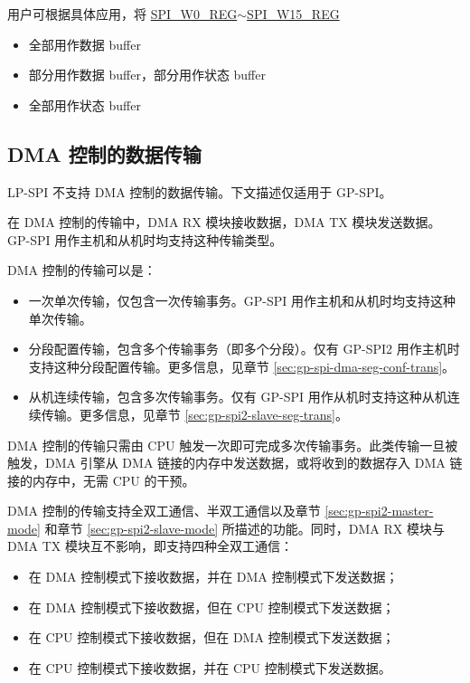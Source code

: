 \documentclass[main\_\_CN.tex]{subfiles}
\begin{document}
用户可根据具体应用，将 \hyperref[regdesc:SPIW0REG]{SPI\_W0\_REG}$\sim$\hyperref[regdesc:SPIW15REG]{SPI\_W15\_REG}
\begin{itemize}
    \item 全部用作数据 buffer
    \item 部分用作数据 buffer，部分用作状态 buffer
    \item 全部用作状态 buffer
\end{itemize}


\subsection{DMA 控制的数据传输}\label{sec:usage-of-gp-spi2-dma-controlled-mode}
\vspace{2em}
\begin{tiplisting}
    LP-SPI 不支持 DMA 控制的数据传输。下文描述仅适用于 GP-SPI。
\end{tiplisting}

在 DMA 控制的传输中，DMA RX 模块接收数据，DMA TX 模块发送数据。GP-SPI 用作主机和从机时均支持这种传输类型。

DMA 控制的传输可以是：

\begin{itemize}
    \item 一次单次传输，仅包含一次传输事务。GP-SPI 用作主机和从机时均支持这种单次传输。
    \item 分段配置传输，包含多个传输事务（即多个分段）。仅有 GP-SPI2 用作主机时支持这种分段配置传输。更多信息，见章节 \ref{sec:gp-spi-dma-seg-conf-trans}。
    \item 从机连续传输，包含多次传输事务。仅有 GP-SPI 用作从机时支持这种从机连续传输。更多信息，见章节 \ref{sec:gp-spi2-slave-seg-trans}。
\end{itemize}

DMA 控制的传输只需由 CPU 触发一次即可完成多次传输事务。此类传输一旦被触发，DMA 引擎从 DMA 链接的内存中发送数据，或将收到的数据存入 DMA 链接的内存中，无需 CPU 的干预。

DMA 控制的传输支持全双工通信、半双工通信以及章节 \ref{sec:gp-spi2-master-mode} 和章节 \ref{sec:gp-spi2-slave-mode} 所描述的功能。同时，DMA RX 模块与 DMA TX 模块互不影响，即支持四种全双工通信：

\begin{itemize}
    \item 在 DMA 控制模式下接收数据，并在 DMA 控制模式下发送数据；
    
    \item 在 DMA 控制模式下接收数据，但在 CPU 控制模式下发送数据； 
    
    \item 在 CPU 控制模式下接收数据，但在 DMA 控制模式下发送数据；
    
    \item 在 CPU 控制模式下接收数据，并在 CPU 控制模式下发送数据。
    
\end{itemize}
\end{document}
